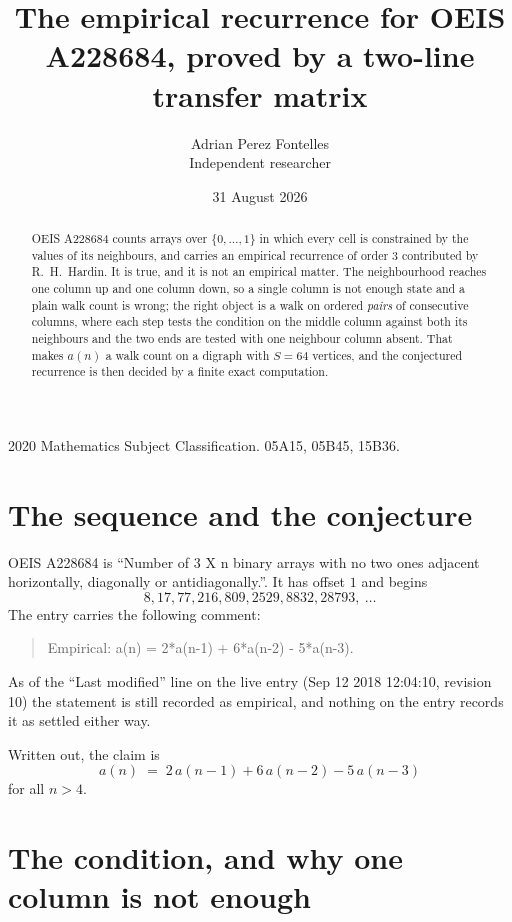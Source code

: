 \documentclass[11pt,a4paper]{article}
\title{The empirical recurrence for OEIS A228684, proved by a two-line transfer matrix}
\author{Adrian Perez Fontelles\\ \small Independent researcher}
\date{31 August 2026}
\theoremstyle{plain}
\theoremstyle{definition}
\begin{document}
\maketitle

\begin{abstract}
OEIS A228684 counts arrays over $\{0,\dots,1\}$ in which every cell is constrained by the
values of its neighbours, and carries an empirical recurrence of order $3$ contributed
by R.~H.~Hardin. It is true, and it is not an empirical matter. The neighbourhood reaches one
column up and one column down, so a single column is not enough state and a plain walk count
is wrong; the right object is a walk on ordered \emph{pairs} of consecutive columns, where
each step tests the condition on the middle column against both its neighbours and the two
ends are tested with one neighbour column absent. That makes $a(n)$ a walk count on a digraph
with $S=64$ vertices, and the conjectured recurrence is then decided by a finite exact
computation.
\end{abstract}

\noindent\small 2020 Mathematics Subject Classification. 05A15, 05B45, 15B36.\normalsize

\section{The sequence and the conjecture}

OEIS A228684 is ``Number of 3 X n binary arrays with no two ones adjacent horizontally, diagonally or antidiagonally.''. It has offset $1$ and begins
\[
8, 17, 77, 216, 809, 2529, 8832, 28793,\ \dots
\]
The entry carries the following comment:
\begin{quote}\small
Empirical: a(n) = 2*a(n-1) + 6*a(n-2) - 5*a(n-3).
\end{quote}
As of the ``Last modified'' line on the live entry (Sep 12 2018 12:04:10, revision 10) the statement is
still recorded as empirical, and nothing on the entry records it as settled either way.

Written out, the claim is
\begin{equation}\label{eq:conj}
a(n)\;=\;2\,a(n-1) + 6\,a(n-2) - 5\,a(n-3)
\end{equation}
for all $n>4$.

\section{The condition, and why one column is not enough}
\end{document}
